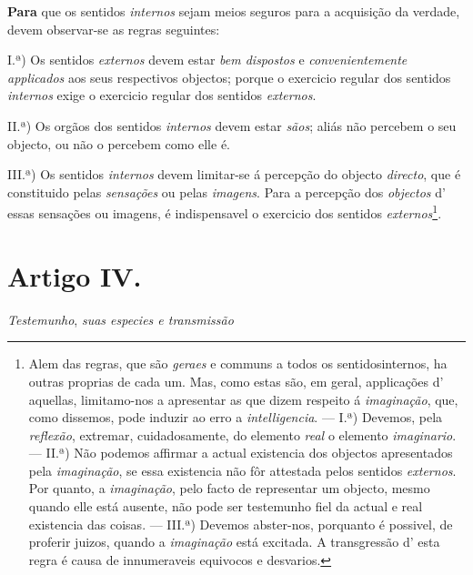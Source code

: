 
 
\textbf{Para} que os sentidos \emph{internos} sejam meios seguros para a acquisição da verdade, devem observar-se as regras seguintes:

I.ª) Os sentidos \emph{externos} devem estar \emph{bem dispostos} e \emph{convenientemente applicados} aos seus respectivos objectos; porque o exercicio regular dos sentidos \emph{internos} exige o exercicio regular dos sentidos \emph{externos}.

II.ª) Os orgãos dos sentidos \emph{internos} devem estar \emph{sãos}; aliás não percebem o seu objecto, ou não o percebem como elle é.

III.ª) Os sentidos \emph{internos} devem limitar-se á percepção do objecto \emph{directo}, que é constituido pelas \emph{sensações} ou pelas \emph{imagens}. Para a percepção dos \emph{objectos} d' essas sensações ou imagens, é indispensavel o exercicio dos sentidos \emph{externos}\footnote{Alem das regras, que são \emph{geraes} e communs a todos os sentidosinternos, ha outras proprias de cada um. Mas, como estas são, em geral, applicações d' aquellas, limitamo-nos a apresentar as que dizem respeito á \emph{imaginação}, que, como dissemos, pode induzir ao erro a \emph{intelligencia}. --- I.ª) Devemos, pela \emph{reflexão}, extremar, cuidadosamente, do elemento \emph{real} o elemento \emph{imaginario}. --- II.ª) Não podemos affirmar a actual existencia dos objectos apresentados pela \emph{imaginação}, se essa existencia não fôr attestada pelos sentidos \emph{externos}. Por quanto, a \emph{imaginação}, pelo facto de representar um objecto, mesmo quando elle está ausente, não pode ser testemunho fiel da actual e real existencia das coisas. --- III.ª) Devemos abster-nos, porquanto é possivel, de proferir juizos, quando a \emph{imaginação} está excitada. A transgressão d' esta regra é causa de innumeraveis equivocos e desvarios.}.


\section*{Artigo IV.}

 \emph{Testemunho}, \emph{suas especies e transmissão}


